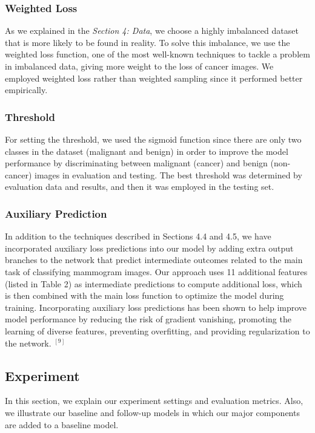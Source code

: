 \subsubsection{Weighted Loss}
As we explained in the \textit{Section 4: Data}, we choose a highly imbalanced dataset that is more likely to be found in reality. To solve this imbalance, we use the weighted loss function, one of the most well-known techniques to tackle a problem in imbalanced data, giving more weight to the loss of cancer images. We employed weighted loss rather than weighted sampling since it performed better empirically.

\subsubsection{Threshold}
For setting the threshold, we used the sigmoid function since there are only two classes in the dataset (malignant and benign) in order to improve the model performance by discriminating between malignant (cancer) and benign (non-cancer) images in evaluation and testing. The best threshold was determined by evaluation data and results, and then it was employed in the testing set.
 
\subsubsection{Auxiliary Prediction}
In addition to the techniques described in Sections 4.4 and 4.5, we have incorporated auxiliary loss predictions into our model by adding extra output branches to the network that predict intermediate outcomes related to the main task of classifying mammogram images. Our approach uses 11 additional features (listed in Table 2) as intermediate predictions to compute additional loss, which is then combined with the main loss function to optimize the model during training. Incorporating auxiliary loss predictions has been shown to help improve model performance by reducing the risk of gradient vanishing, promoting the learning of diverse features, preventing overfitting, and providing regularization to the network. ${}^{[9]}$

\subsection{Experiment}
In this section, we explain our experiment settings and evaluation metrics. Also, we illustrate our baseline and follow-up models in which our major components are added to a baseline model.

